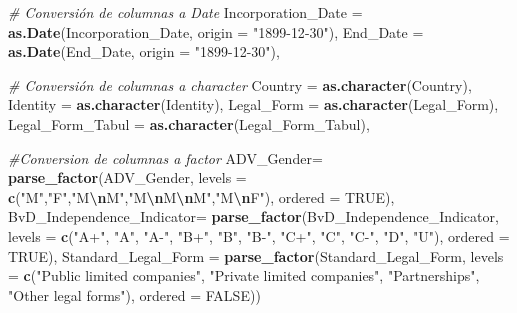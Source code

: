 \documentclass[
]{article}
\newenvironment{Shaded}{\begin{snugshade}}{\end{snugshade}}
\newcommand{\AttributeTok}[1]{\textcolor[rgb]{0.13,0.29,0.53}{#1}}
\newcommand{\CommentTok}[1]{\textcolor[rgb]{0.56,0.35,0.01}{\textit{#1}}}
\newcommand{\ConstantTok}[1]{\textcolor[rgb]{0.56,0.35,0.01}{#1}}
\newcommand{\FunctionTok}[1]{\textcolor[rgb]{0.13,0.29,0.53}{\textbf{#1}}}
\newcommand{\NormalTok}[1]{#1}
\newcommand{\SpecialCharTok}[1]{\textcolor[rgb]{0.81,0.36,0.00}{\textbf{#1}}}
\newcommand{\StringTok}[1]{\textcolor[rgb]{0.31,0.60,0.02}{#1}}
\begin{document}
\begin{Shaded}
\begin{Highlighting}[]
    \CommentTok{\# Conversión de columnas a Date }
    \AttributeTok{Incorporation\_Date =} \FunctionTok{as.Date}\NormalTok{(Incorporation\_Date, }\AttributeTok{origin =} \StringTok{"1899{-}12{-}30"}\NormalTok{),}
    \AttributeTok{End\_Date =} \FunctionTok{as.Date}\NormalTok{(End\_Date, }\AttributeTok{origin =} \StringTok{"1899{-}12{-}30"}\NormalTok{),}

   \CommentTok{\# Conversión de columnas a character}
    \AttributeTok{Country =} \FunctionTok{as.character}\NormalTok{(Country),}
    \AttributeTok{Identity =} \FunctionTok{as.character}\NormalTok{(Identity),}
    \AttributeTok{Legal\_Form =} \FunctionTok{as.character}\NormalTok{(Legal\_Form),}
    \AttributeTok{Legal\_Form\_Tabul =} \FunctionTok{as.character}\NormalTok{(Legal\_Form\_Tabul),}
   
   \CommentTok{\#Conversion de columnas a factor}
    \AttributeTok{ADV\_Gender=} \FunctionTok{parse\_factor}\NormalTok{(ADV\_Gender,}
                             \AttributeTok{levels =} \FunctionTok{c}\NormalTok{(}\StringTok{"M"}\NormalTok{,}\StringTok{"F"}\NormalTok{,}\StringTok{"M}\SpecialCharTok{\textbackslash{}n}\StringTok{M"}\NormalTok{,}\StringTok{"M}\SpecialCharTok{\textbackslash{}n}\StringTok{M}\SpecialCharTok{\textbackslash{}n}\StringTok{M"}\NormalTok{,}\StringTok{"M}\SpecialCharTok{\textbackslash{}n}\StringTok{F"}\NormalTok{),}
                             \AttributeTok{ordered =} \ConstantTok{TRUE}\NormalTok{),}
    \AttributeTok{BvD\_Independence\_Indicator=} \FunctionTok{parse\_factor}\NormalTok{(BvD\_Independence\_Indicator,}
                                             \AttributeTok{levels =} \FunctionTok{c}\NormalTok{(}\StringTok{"A+"}\NormalTok{, }\StringTok{"A"}\NormalTok{, }\StringTok{"A{-}"}\NormalTok{, }
                                                        \StringTok{"B+"}\NormalTok{, }\StringTok{"B"}\NormalTok{, }\StringTok{"B{-}"}\NormalTok{, }\StringTok{"C+"}\NormalTok{,}
                                                        \StringTok{"C"}\NormalTok{, }\StringTok{"C{-}"}\NormalTok{, }\StringTok{"D"}\NormalTok{, }\StringTok{"U"}\NormalTok{),}
                                             \AttributeTok{ordered =} \ConstantTok{TRUE}\NormalTok{),}
    \AttributeTok{Standard\_Legal\_Form =} \FunctionTok{parse\_factor}\NormalTok{(Standard\_Legal\_Form,}
                                       \AttributeTok{levels =} \FunctionTok{c}\NormalTok{(}\StringTok{"Public limited companies"}\NormalTok{, }
                                                  \StringTok{"Private limited companies"}\NormalTok{, }
                                                  \StringTok{"Partnerships"}\NormalTok{, }
                                                  \StringTok{"Other legal forms"}\NormalTok{),}
                                       \AttributeTok{ordered =} \ConstantTok{FALSE}\NormalTok{))}
\end{Highlighting}
\end{Shaded}
\end{document}
